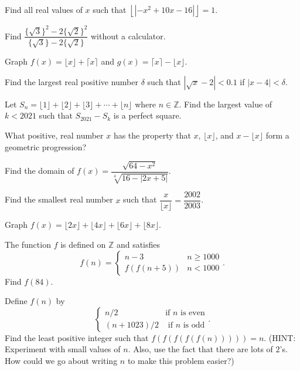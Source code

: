 \documentclass[../book.tex]{subfiles}
\begin{document}
\begin{challengeset}
\item Find all real values of $x$ such that $\left\lfloor{\left|-x^2+10x-16\right|}\right\rfloor=1$. \vspace{3mm}
\item Find $\dfrac{\{\sqrt{3}\}^2-2\{\sqrt{2}\}^2}{\{\sqrt{3}\}-2\{\sqrt{2}\}}$ without a calculator. \vspace{3mm}
\item Graph $f(x)=\lfloor{x}\rfloor+\lceil{x}\rceil$ and $g(x)=\lceil{x}\rceil-\lfloor{x}\rfloor$. \vspace{3mm}
\item Find the largest real positive number $\delta$ such that $\left|\sqrt{x}-2\right|<0.1$ if $|x-4|<\delta$. \vspace{3mm}
\item Let $S_n=\lfloor{1}\rfloor+\lfloor{2}\rfloor+\lfloor{3}\rfloor+\cdots+\lfloor{n}\rfloor$ where $n\in\mathbb{Z}$.  Find the largest value of $k<2021$ such that $S_{2021}-S_k$ is a perfect square. \vspace{3mm}
\item What positive, real number $x$ has the property that $x$, $\lfloor{x}\rfloor$, and $x-\lfloor{x}\rfloor$ form a geometric progression?\vspace{3mm}
\item Find the domain of $f(x)=\dfrac{\sqrt{64-x^2}}{\sqrt[4]{16-|2x+5|}}$. \vspace{3mm}
\item Find the smallest real number $x$ such that $\dfrac{x}{\lfloor{x}\rfloor}=\dfrac{2002}{2003}$. \vspace{3mm}
\item Graph $f(x)=\lfloor{2x}\rfloor+\lfloor{4x}\rfloor+\lfloor{6x}\rfloor+\lfloor{8x}\rfloor$. \vspace{3mm}
\item The function $f$ is defined on $\mathbb{Z}$ and satisfies $$f(n)=\begin{cases} n-3 & n\geq 1000 \\ f(f(n+5)) & n<1000\end{cases}.$$  Find $f(84)$. \vspace{3mm}
\item Define $f(n)$ by $$\begin{cases} n/2 & \text{if } n \text{ is even} \\ (n+1023)/2 & \text{ if } n \text{ is odd} \end{cases}.$$  Find the least positive integer such that $f(f(f(f(f(n)))))=n$. (HINT: Experiment with small values of $n$.  Also, use the fact that there are lots of $2$'s.  How could we go about writing $n$ to make this problem easier?) \vspace{3mm}
\end{challengeset}
\end{document}
